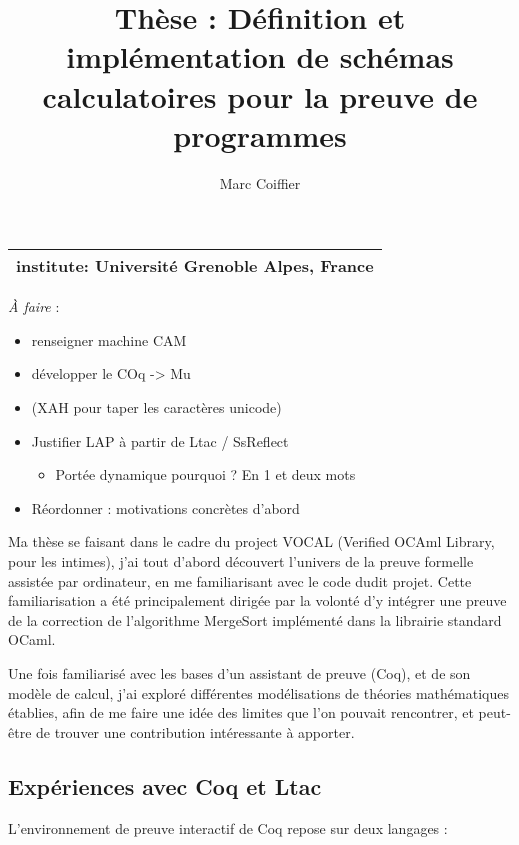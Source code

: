 \documentclass[]{article}
\title{Thèse : Définition et implémentation de schémas calculatoires pour la
preuve de programmes}
\author{Marc Coiffier}
\date{}
\providecommand{\tightlist}{%
  \setlength{\itemsep}{0pt}\setlength{\parskip}{0pt}}
\begin{document}
\maketitle

{
\hypersetup{linkcolor=black}
\setcounter{tocdepth}{3}
\tableofcontents
\newpage
}

\begin{longtable}[c]{@{}l@{}}
\toprule
institute: Université Grenoble Alpes, France\tabularnewline
\bottomrule
\end{longtable}

\emph{À faire} :

\begin{itemize}
\tightlist
\item
  renseigner machine CAM
\item
  développer le COq -\textgreater{} Mu
\item
  (XAH pour taper les caractères unicode)
\item
  Justifier LAP à partir de Ltac / SsReflect

  \begin{itemize}
  \tightlist
  \item
    Portée dynamique pourquoi ? En 1 et deux mots
  \end{itemize}
\item
  Réordonner : motivations concrètes d'abord
\end{itemize}

Ma thèse se faisant dans le cadre du project VOCAL (Verified OCAml
Library, pour les intimes), j'ai tout d'abord découvert l'univers de la
preuve formelle assistée par ordinateur, en me familiarisant avec le
code dudit projet. Cette familiarisation a été principalement dirigée
par la volonté d'y intégrer une preuve de la correction de l'algorithme
MergeSort implémenté dans la librairie standard OCaml.

Une fois familiarisé avec les bases d'un assistant de preuve (Coq), et
de son modèle de calcul, j'ai exploré différentes modélisations de
théories mathématiques établies, afin de me faire une idée des limites
que l'on pouvait rencontrer, et peut-être de trouver une contribution
intéressante à apporter.

\subsection{Expériences avec Coq et
Ltac}\label{expuxe9riences-avec-coq-et-ltac}

L'environnement de preuve interactif de Coq repose sur deux langages :
\end{document}
